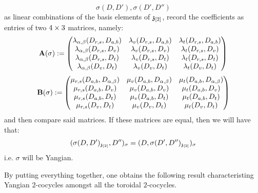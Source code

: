 \begin{remark}
                $$\sigma(D, D'), \sigma(D', D'')$$
            as linear combinations of the basis elements of $\mathfrak{z}_{[2]}$, record the coefficients as entries of two $4 \x 3$ matrices, namely:
                $$
                    \mathbf{A}(\sigma) :=
                    \begin{pmatrix}
                        \lambda_{\alpha, \beta}(D_{r, s}, D_{a, b}) & \lambda_v(D_{r, s}, D_{a, b}) & \lambda_t(D_{r, s}, D_{a, b})
                        \\
                        \lambda_{\alpha, \beta}(D_{r, s}, D_v) & \lambda_v(D_{r, s}, D_v) & \lambda_t(D_{r, s}, D_v)
                        \\
                        \lambda_{\alpha, \beta}(D_{r, s}, D_t) & \lambda_v(D_{r, s}, D_t) & \lambda_t(D_{r, s}, D_t)
                        \\
                        \lambda_{\alpha, \beta}(D_v, D_t) & \lambda_v(D_v, D_t) & \lambda_t(D_v, D_t)
                    \end{pmatrix}
                $$
                $$
                    \mathbf{B}(\sigma) :=
                    \begin{pmatrix}
                       \mu_{r, s}(D_{a, b}, D_{\alpha, \beta}) & \mu_v(D_{a, b}, D_{\alpha, \beta}) & \mu_t(D_{a, b}, D_{\alpha, \beta})
                        \\
                       \mu_{r, s}(D_{a, b}, D_v) & \mu_v(D_{a, b}, D_v) & \mu_t(D_{a, b}, D_v)
                        \\
                       \mu_{r, s}(D_{a, b}, D_t) & \mu_v(D_{a, b}, D_t) & \mu_t(D_{a, b}, D_t)
                        \\
                       \mu_{r, s}(D_v, D_t) & \mu_v(D_v, D_t) & \mu_t(D_v, D_t)
                    \end{pmatrix}
                $$
            and then compare said matrices. If these matrices are equal, then we will have that:
                $$(\sigma(D, D')_{\mathfrak{z}_{[2]}}, D'')_{\sigma} = (D, \sigma(D', D'')_{\mathfrak{z}_{[2]}})_{\sigma}$$
            i.e. $\sigma$ will be Yangian.
        \end{remark}
        By putting everything together, one obtains the following result characteristing Yangian $2$-cocycles amongst all the toroidal $2$-cocycles.
